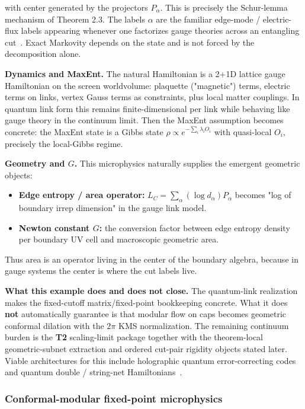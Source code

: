 with center generated by the projectors \(P_\alpha\). This is precisely the Schur-lemma mechanism of Theorem 2.3. The labels \(\alpha\) are the familiar edge-mode / electric-flux labels appearing whenever one factorizes gauge theories across an entangling cut~\cite{donnellyWall15}. Exact Markovity depends on the state and is not forced by the decomposition alone.

\textbf{Dynamics and MaxEnt.} The natural Hamiltonian is a 2+1D lattice gauge Hamiltonian on the screen worldvolume: plaquette ("magnetic") terms, electric terms on links, vertex Gauss terms as constraints, plus local matter couplings. In quantum link form this remains finite-dimensional per link while behaving like gauge theory in the continuum limit. Then the MaxEnt assumption becomes concrete: the MaxEnt state is a Gibbs state \(\rho \propto e^{-\sum_i \lambda_i O_i}\) with quasi-local \(O_i\), precisely the local-Gibbs regime.

\textbf{Geometry and \(G\).} This microphysics naturally supplies the emergent geometric objects:

\begin{itemize}
\tightlist
\item
  \textbf{Edge entropy / area operator:} \(L_C = \sum_\alpha (\log d_\alpha) P_\alpha\) becomes "log of boundary irrep dimension" in the gauge link model.
\item
  \textbf{Newton constant \(G\):} the conversion factor between edge entropy density per boundary UV cell and macroscopic geometric area.
\end{itemize}

Thus area is an operator living in the center of the boundary algebra, because in gauge systems the center is where the cut labels live.

\textbf{What this example does and does not close.} The quantum-link realization makes the fixed-cutoff matrix/fixed-point bookkeeping concrete. What it does \textbf{not} automatically guarantee is that modular flow on caps becomes geometric conformal dilation with the \(2\pi\) KMS normalization. The remaining continuum burden is the \textbf{T2} scaling-limit package together with the theorem-local geometric-subnet extraction and ordered cut-pair rigidity objects stated later. Viable architectures for this include holographic quantum error-correcting codes~\cite{pastawski15} and quantum double / string-net Hamiltonians~\cite{levinWen05}.

\subsubsection{Conformal-modular fixed-point microphysics}\label{27-conformal-modular-fixed-point-microphysics-cmfp}


